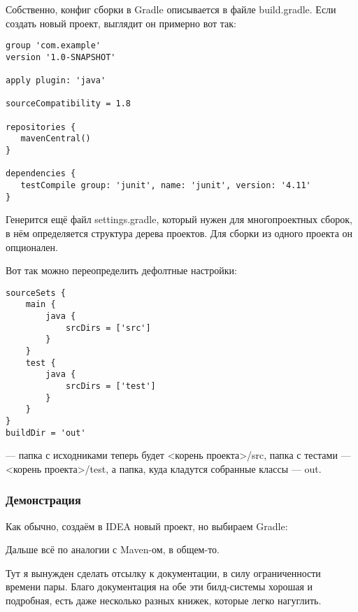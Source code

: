 \documentclass[a5paper]{article}
\begin{document}
Собственно, конфиг сборки в Gradle описывается в файле build.gradle. Если создать новый проект, выглядит он примерно вот так:
\begin{verbatim}
group 'com.example'
version '1.0-SNAPSHOT'

apply plugin: 'java'

sourceCompatibility = 1.8

repositories {
   mavenCentral()
}

dependencies {
   testCompile group: 'junit', name: 'junit', version: '4.11'
}
\end{verbatim}

Генерится ещё файл settings.gradle, который нужен для многопроектных сборок, в нём определяется структура дерева проектов. Для сборки из одного проекта он опционален.

Вот так можно переопределить дефолтные настройки:

\begin{verbatim}
sourceSets {
    main {
        java {
            srcDirs = ['src']
        }
    }
    test {
        java {
            srcDirs = ['test']
        }
    }
}
buildDir = 'out'
\end{verbatim}

--- папка с исходниками теперь будет <корень проекта>/src, папка с тестами --- <корень проекта>/test, а папка, куда кладутся собранные классы --- out.

\subsubsection{Демонстрация}

Как обычно, создаём в IDEA новый проект, но выбираем Gradle:

Дальше всё по аналогии с Maven-ом, в общем-то.

Тут я вынужден сделать отсылку к документации, в силу ограниченности времени пары. Благо документация на обе эти билд-системы хорошая и подробная, есть даже несколько разных книжек, которые легко нагуглить.
\end{document}
